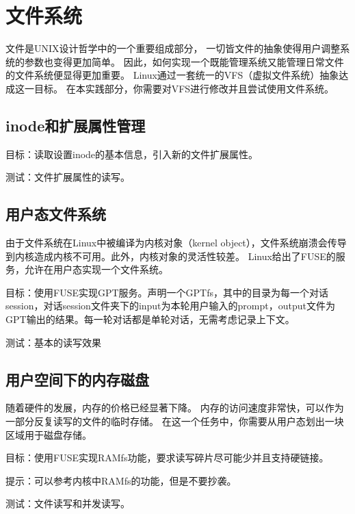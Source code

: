 \chapter{文件系统}
文件是UNIX设计哲学中的一个重要组成部分，
一切皆文件的抽象使得用户调整系统的参数也变得更加简单。
因此，如何实现一个既能管理系统又能管理日常文件的文件系统便显得更加重要。
Linux通过一套统一的VFS（虚拟文件系统）抽象达成这一目标。
在本实践部分，你需要对VFS进行修改并且尝试使用文件系统。

\section{inode和扩展属性管理}

目标：读取设置inode的基本信息，引入新的文件扩展属性。

测试：文件扩展属性的读写。



\section{用户态文件系统}
由于文件系统在Linux中被编译为内核对象（kernel object），文件系统崩溃会传导到内核造成内核不可用。此外，内核对象的灵活性较差。
Linux给出了FUSE的服务，允许在用户态实现一个文件系统。

目标：使用FUSE实现GPT服务。声明一个GPTfs，其中的目录为每一个对话session，对话session文件夹下的input为本轮用户输入的prompt，output文件为GPT输出的结果。每一轮对话都是单轮对话，无需考虑记录上下文。

测试：基本的读写效果

\section{用户空间下的内存磁盘}
随着硬件的发展，内存的价格已经显著下降。
内存的访问速度非常快，可以作为一部分反复读写的文件的临时存储。
在这一个任务中，你需要从用户态划出一块区域用于磁盘存储。

目标：使用FUSE实现RAMfs功能，要求读写碎片尽可能少并且支持硬链接。

提示：可以参考内核中RAMfs的功能，但是不要抄袭。

测试：文件读写和并发读写。
